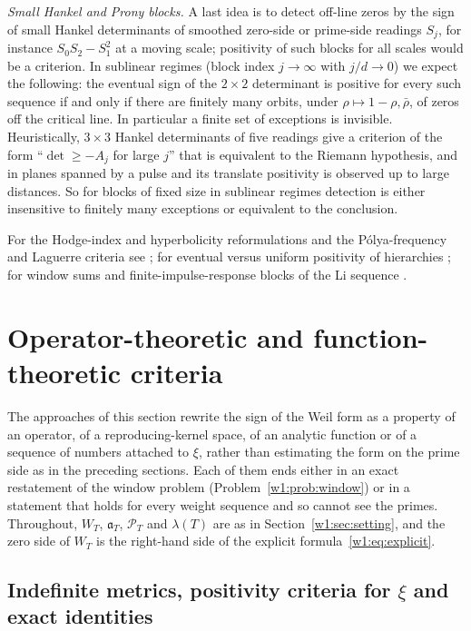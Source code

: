 \documentclass[11pt]{amsart}
\theoremstyle{definition}
\theoremstyle{remark}
\numberwithin{equation}{section}
\newcommand{\PT}{\mathcal{P}_T}                        %
\newcommand{\aT}{\mathfrak{a}_T}                       %
\newcommand{\WT}{W_T}                                  %
\newcommand{\lam}{\lambda(T)}                          %
\begin{document}
\label{w5:subsec:hankel}%
\emph{Small Hankel and Prony blocks.} A last idea is to detect off-line zeros by the sign of small Hankel determinants
of smoothed zero-side or prime-side readings $S_j$, for instance $S_0S_2-S_1^2$ at a moving scale; positivity of such
blocks for all scales would be a criterion. In sublinear regimes (block index $j\to\infty$ with $j/d\to0$) we expect
the following: the eventual sign of the $2\times2$ determinant is positive for every such sequence if and only if there
are finitely many orbits, under $\rho\mapsto1-\rho,\bar\rho$, of zeros off the critical line. In particular a finite
set of exceptions is invisible. Heuristically, $3\times3$ Hankel determinants of five readings give a criterion of the
form ``$\det\ge-A_j$ for large $j$'' that is equivalent to the Riemann hypothesis, and in planes spanned by a pulse and
its translate positivity is observed up to large distances. So for blocks of fixed size in sublinear regimes detection
is either insensitive to finitely many exceptions or equivalent to the conclusion.

For the Hodge-index and hyperbolicity reformulations and the P\'olya-frequency and Laguerre criteria see \cite{P14};
for eventual versus uniform positivity of hierarchies \cite{P15}; for window sums and finite-impulse-response blocks of
the Li sequence \cite{P38}.

\section{Operator-theoretic and function-theoretic criteria}
\label{w6:sec:operators}

The approaches of this section rewrite the sign of the Weil form as a property of an operator, of a
reproducing-kernel space, of an analytic function or of a sequence of numbers attached to $\xi$,
rather than estimating the form on the prime side as in the preceding sections. Each of them ends
either in an exact restatement of the window problem (Problem~\ref{w1:prob:window}) or in a
statement that holds for every weight sequence and so cannot see the primes. Throughout, $\WT$,
$\aT$, $\PT$ and $\lam$ are as in Section~\ref{w1:sec:setting}, and the zero side of $\WT$ is the
right-hand side of the explicit formula~\eqref{w1:eq:explicit}.

\subsection{Indefinite metrics, positivity criteria for \texorpdfstring{$\xi$}{xi} and exact identities}
\label{w6:fam:R10}
\end{document}
